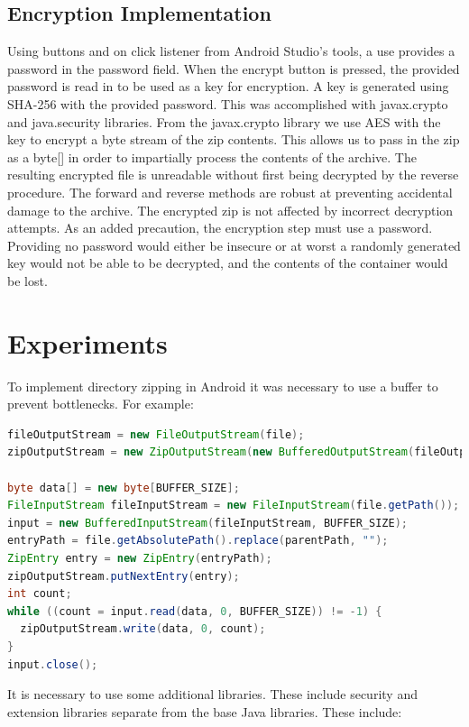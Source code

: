\documentclass[10pt,a4paper]{article}
\begin{document}
\subsection{Encryption Implementation}
Using buttons and on click listener from Android Studio's tools, a use provides a password in the password field. When the encrypt button is pressed, the provided password is read in to be used as a key for encryption. A key is generated using SHA-256 with the provided password. This was accomplished with javax.crypto and java.security libraries. From the javax.crypto library we use AES with the key to encrypt a byte stream of the zip contents. This allows us to pass in the zip as a byte[] in order to impartially process the contents of the archive. The resulting encrypted file is unreadable without first being decrypted by the reverse procedure. The forward and reverse methods are robust at preventing accidental damage to the archive. The encrypted zip is not affected by incorrect decryption attempts. As an added precaution, the encryption step must use a password. Providing no password would either be insecure or at worst a randomly generated key would not be able to be decrypted, and the contents of the container would be lost. 

\section{Experiments}
To implement directory zipping in Android it was necessary to use a buffer to prevent bottlenecks. For example:

\begin{lstlisting}[language=Java]
fileOutputStream = new FileOutputStream(file);
zipOutputStream = new ZipOutputStream(new BufferedOutputStream(fileOutputStream));

byte data[] = new byte[BUFFER_SIZE];
FileInputStream fileInputStream = new FileInputStream(file.getPath());
input = new BufferedInputStream(fileInputStream, BUFFER_SIZE);
entryPath = file.getAbsolutePath().replace(parentPath, "");
ZipEntry entry = new ZipEntry(entryPath);
zipOutputStream.putNextEntry(entry);
int count;
while ((count = input.read(data, 0, BUFFER_SIZE)) != -1) {
  zipOutputStream.write(data, 0, count);
}
input.close();

\end{lstlisting}

It is necessary to use some additional libraries. These include security and extension libraries separate from the base Java libraries. These include:
\end{document}
